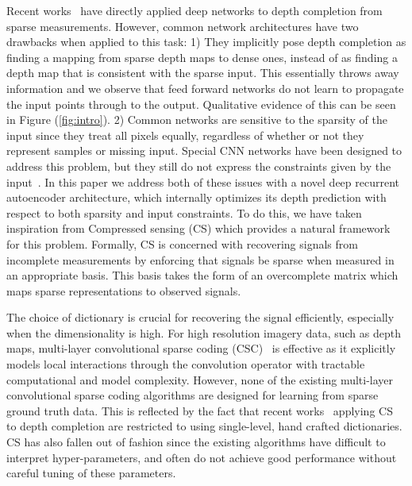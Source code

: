 Recent works~\cite{sparsetodense,uhrig} have directly applied deep networks to depth completion from sparse measurements. However, common network architectures have two drawbacks when applied to this task: 1) They implicitly pose depth completion as finding a mapping from sparse depth maps to dense ones, instead of as finding a depth map that is consistent with the sparse input. This essentially throws away information and we observe that feed forward networks do not learn to propagate the input points through to the output. Qualitative evidence of this can be seen in Figure (\ref{fig:intro}). 2) Common networks are sensitive to the sparsity of the input since they treat all pixels equally, regardless of whether or not they represent samples or missing input. Special CNN networks have been designed to address this problem, but they still do not express the constraints given by the input~\cite{uhrig}. In this paper we address both of these issues with a novel deep recurrent autoencoder architecture, which internally optimizes its depth prediction with respect to both sparsity and input constraints.
To do this, we have taken inspiration from Compressed sensing (CS) which provides a natural framework for this problem. Formally, CS is concerned with recovering signals from incomplete measurements by enforcing that signals be sparse when measured in an appropriate basis. This basis takes the form of an overcomplete matrix which maps sparse representations to observed signals.

The choice of dictionary is crucial for recovering the signal efficiently, especially when the dimensionality is high. For high resolution imagery data, such as depth maps, multi-layer convolutional sparse coding (CSC)~\cite{papyan} is effective as it explicitly models local interactions through the convolution operator with tractable computational and model complexity. However, none of the existing multi-layer convolutional sparse coding algorithms are designed for learning from sparse ground truth data. This is reflected by the fact that recent works~\cite{hawe2011dense,liu2015depth} applying CS to depth completion are restricted to using single-level, hand crafted dictionaries. CS has also fallen out of fashion since the existing algorithms have difficult to interpret hyper-parameters, and often do not achieve good performance without careful tuning of these parameters.

